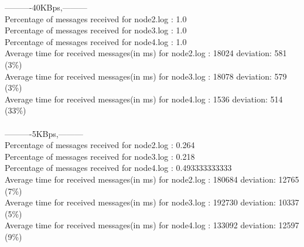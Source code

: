         ----------40KBps,---------\\
        Percentage of messages received for node2.log : 1.0\\
        Percentage of messages received for node3.log : 1.0\\
        Percentage of messages received for node4.log : 1.0\\
        Average time for received messages(in ms) for  node2.log : 18024 	deviation: 581 (3\%)\\
        Average time for received messages(in ms) for  node3.log : 18078 	deviation: 579 (3\%)\\
        Average time for received messages(in ms) for  node4.log : 1536 	deviation: 514 (33\%)\\\\
        ----------5KBps,---------\\
        Percentage of messages received for node2.log : 0.264\\
        Percentage of messages received for node3.log : 0.218\\
        Percentage of messages received for node4.log : 0.493333333333\\
        Average time for received messages(in ms) for  node2.log : 180684 	deviation: 12765 (7\%)\\
        Average time for received messages(in ms) for  node3.log : 192730 	deviation: 10337 (5\%)\\
        Average time for received messages(in ms) for  node4.log : 133092 	deviation: 12597 (9\%)